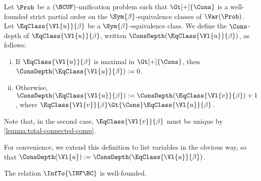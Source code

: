 \begin{Definition}
    Let $\Prob$ be a $(\BCUF)$-unification problem such that $\Gt[+]{\Cons}$ is
    a well-founded strict partial order on the $\Sym{\beta}$-equivalence
    classes of $\Var(\Prob)$. Let $\EqClass{\Vl{u}}{\beta}$ be a
    $\Sym{\beta}$-equivalence class. We define the $\Cons$-depth of
    $\EqClass{\Vl{u}}{\beta}$, written $\ConsDepth(\EqClass{\Vl{u}}{\beta})$, as
    follows:
    \begin{enumerate}[(i)]
        \item If $\EqClass{\Vl{u}}{\beta}$ is maximal in $\Gt[+]{\Cons}$, then
            $\ConsDepth(\EqClass{\Vl{u}}{\beta}) := 0$.
        \item Otherwise, $\ConsDepth(\EqClass{\Vl{u}}{\beta}) :=
            \ConsDepth(\EqClass{\Vl{v}}{\beta}) + 1$, where $\EqClass{\Vl{v}}{\beta}
            \Gt{\Cons} \EqClass{\Vl{u}}{\beta}$.
    \end{enumerate}
    Note that, in the second case, $\EqClass{\Vl{v}}{\beta}$ must be unique by
    \cref{lemma:total-connected-comp}.

    For convenience, we extend this definition to list variables in the obvious
    way, so that $\ConsDepth(\Vl{u}) := \ConsDepth(\EqClass{\Vl{u}}{\beta})$.
\end{Definition}

\begin{Theorem}\label{theorem:inf-bc-terminates}
    The relation $\InfTo{\INF\BC}$ is well-founded.
\end{Theorem}

